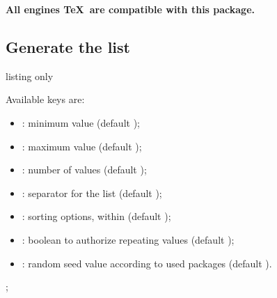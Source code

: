 \documentclass[11pt,a4paper]{ltxdoc}
\begin{document}
\hfill\textbf{All engines \TeX\ are compatible with this package.}\hfill~

\subsection{Generate the list}

\begin{DemoCode}{listing only}
\randintlist[keys]{\macro}
\end{DemoCode}

Available keys are:

\begin{itemize}
	\item {}: minimum value (default );
	\item {}: maximum value (default );
	\item {}: number of values (default );
	\item {}: separator for the list (default \ShowCode{,});
	\item {}: sorting options, within  (default );
	\item {}: boolean to authorize repeating values (default );
	\item {}: random seed value according to used packages (default \ShowCode{-}).
\end{itemize}

\begin{DemoCode}{}
\randintlist{\mylistA}\mylistA
\end{DemoCode}

\begin{DemoCode}{}
\randintlist[sort=asc,min=1,max=50,nb=10]{\mylistB}\mylistB
\end{DemoCode}

\begin{DemoCode}{}
\randintlist[sort=asc,min=1,max=50,nb=15,repeat]{\mylistC}\mylistC
\end{DemoCode}

\begin{DemoCode}{}
\randintlist{\mylistD}\mylistD\par
\readlist*\mylistused{\mylistD}\showitems{\mylistused}\par
\mylistused[1]; \mylistused[-1]
\end{DemoCode}
\end{document}
